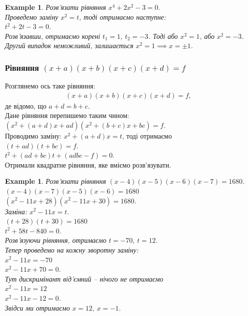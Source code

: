 \documentclass[a4paper, 10pt]{article}
\theoremstyle{theoremdd}
\theoremstyle{theoremdd}
\theoremstyle{theoremdd}
\theoremstyle{theoremdd}
\newtheorem{example}[theorem]{Example}
\theoremstyle{theoremdd}
\theoremstyle{theoremdd}
\theoremstyle{theoremdd}
\theoremstyle{theoremdd}
\begin{document}
\begin{example}
Розв'язати рівняння $x^4 + 2x^2 - 3 = 0$.\\
Проведемо заміну $x^2 = t$, тоді отримаємо наступне:\\
$t^2 + 2t - 3 = 0$.\\
Розв'язавши, отримаємо корені $t_1 = 1,\ t_2 = -3$. Тоді або $x^2 = 1$, або $x^2 = -3$. Другий випадок неможливий, залишається $x^2 = 1 \implies x = \pm 1$.
\end{example}

\subsubsection{Рівняння $(x+a)(x+b)(x+c)(x+d) = f$}
Розглянемо ось таке рівняння:
\begin{align*}
(x+a)(x+b)(x+c)(x+d) = f,
\end{align*}
де відомо, що $a+d = b+c$.\\
Дане рівняння перепишемо таким чином:\\
$(x^2+ (a+d)x+ad)(x^2 + (b+c)x +bc) = f$.\\
Проводимо заміну: $x^2 + (a+d)x = t$, тоді отримаємо\\
$(t+ad)(t + bc) = f$.\\
$t^2 + (ad + bc)t + (adbc - f) = 0$.\\
Отримали квадратне рівняння, яке вміємо розв'язувати.

\begin{example}
Розв'язати рівняння $(x-4)(x-5)(x-6)(x-7) = 1680$.\\
$(x-4)(x-7)(x-5)(x-6) = 1680$\\
$(x^2 - 11x + 28)(x^2 - 11 x + 30) = 1680$.\\
Заміна: $x^2 - 11x = t$.\\
$(t + 28)(t + 30) = 1680$\\
$t^2 + 58t - 840 = 0$.\\
Розв'язуючи рівняння, отримаємо $t = -70,\ t = 12$.\\
Тепер проведемо на кожну зворотну заміну:\\
$x^2 -11x = -70$\\
$x^2 -11x + 70 = 0$.\\
Тут дискримінант від'ємний -- нічого не отримаємо
\bigskip \\
$x^2 -11 x = 12$\\
$x^2 - 11x - 12 = 0$.\\
Звідси ми отримаємо $x = 12,\ x = -1$.
\end{example}
\end{document}
